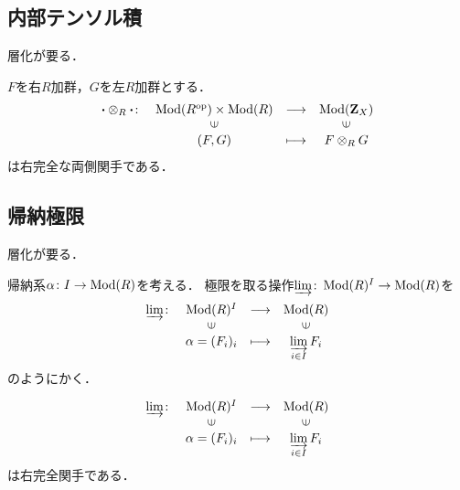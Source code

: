 \subsection{内部テンソル積}
層化が要る．

\begin{PRP}
    $F$を右$R$加群，$G$を左$R$加群とする．
    \begin{equation*}
        \begin{array}{rccc}
            {\boldsymbol{\cdot}}\otimes_R{\boldsymbol{\cdot}}\colon
            &\Mod(R^{\op})\times\Mod(R)
            &\longrightarrow&\Mod(\zz_X)\\
            &\rotatebox{90}{$\in$}&&\rotatebox{90}{$\in$}\\
            & (F,G)&\longmapsto&F\otimes_R G
        \end{array}
    \end{equation*}
    は右完全な両側関手である．
\end{PRP}

\subsection{帰納極限}
層化が要る．

帰納系$\alpha\colon I\to \mathop{\mathrm{Mod}}\nolimits(R)$を考える．
極限を取る操作$\varinjlim\colon\mathop{\mathrm{Mod}}\nolimits(R)^I\to\mathop{\mathrm{Mod}}\nolimits(R)$を
\begin{equation*}
    \begin{array}{rccc}
        \varinjlim\colon&\Mod(R)^I&\longrightarrow&\Mod(R)\\
            &\rotatebox{90}{$\in$}&&\rotatebox{90}{$\in$}\\
            &\alpha=(F_i)_i &\longmapsto&\varinjlim\limits_{i\in I}F_i
    \end{array}
\end{equation*}
のようにかく．

\begin{PRP}
    \begin{equation*}
        \begin{array}{rccc}
            \varinjlim\colon&\Mod(R)^I&\longrightarrow&\Mod(R)\\
                &\rotatebox{90}{$\in$}&&\rotatebox{90}{$\in$}\\
                &\alpha=(F_i)_i &\longmapsto&\varinjlim\limits_{i\in I}F_i
        \end{array}
    \end{equation*}
    は右完全関手である．        
\end{PRP}

